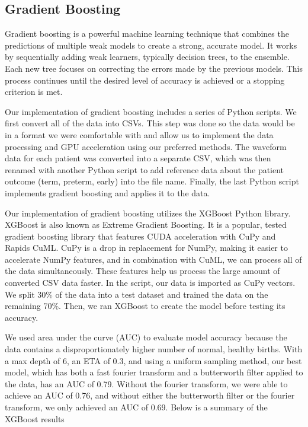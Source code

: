 \documentclass[conference]{IEEEtran}
\begin{document}
\subsection{Gradient Boosting}
Gradient boosting is a powerful machine learning technique that combines the predictions of multiple weak models to create a strong, accurate model. It works by sequentially adding weak learners, typically decision trees, to the ensemble. Each new tree focuses on correcting the errors made by the previous models. This process continues until the desired level of accuracy is achieved or a stopping criterion is met.

Our implementation of gradient boosting includes a series of Python scripts. We first convert all of the data into CSVs. This step was done so the data would be in a format we were comfortable with and allow us to implement the data processing and GPU acceleration using our preferred methods. The waveform data for each patient was converted into a separate CSV, which was then renamed with another Python script to add reference data about the patient outcome (term, preterm, early) into the file name. Finally, the last Python script implements gradient boosting and applies it to the data. 

Our implementation of gradient boosting utilizes the XGBoost Python library. XGBoost is also known as Extreme Gradient Boosting. It is a popular, tested gradient boosting library that features CUDA acceleration with CuPy and Rapids CuML. CuPy is a drop in replacement for NumPy, making it easier to accelerate NumPy features, and in combination with CuML, we can process all of the data simultaneously. These features help us process the large amount of converted CSV data faster. In the script, our data is imported as CuPy vectors. We split 30\% of the data into a test dataset and trained the data on the remaining 70\%. Then, we ran XGBoost to create the model before testing its accuracy. 

We used area under the curve (AUC) to evaluate model accuracy because the data contains a disproportionately higher number of normal, healthy births. With a max depth of 6, an ETA of 0.3, and using a uniform sampling method, our best model, which has both a fast fourier transform and a butterworth filter applied to the data, has an AUC of 0.79. Without the fourier transform, we were able to achieve an AUC of 0.76, and without either the butterworth filter or the fourier transform, we only achieved an AUC of 0.69.  Below is a summary of the XGBoost results
\end{document}
